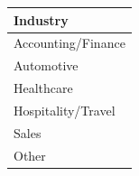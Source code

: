 \documentclass[11pt,a4paper]{article}
\begin{document}
\begin{table}[h]
\begin{tabular}{|l|}
\hline
Industry \\ \hline
Accounting/Finance \\ \hline
Automotive \\ \hline
Healthcare \\ \hline
Hospitality/Travel \\ \hline
Sales \\ \hline
Other \\ \hline
\end{tabular}
\end{table}
\end{document}
